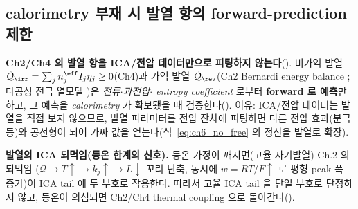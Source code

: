 \subsection{calorimetry 부재 시 발열 항의 forward-prediction 제한}\label{sec:ch6_heat}
\textbf{Ch2/Ch4 의 발열 항을 ICA/전압 데이터만으로 피팅하지 않는다}(). 비가역 발열
$\dot{\mathcal Q}_\irr=\sum_j n_j^{\eff}I_j\eta_j\ge0$(Ch4)과 가역 발열 $\dot{\mathcal Q}_\rev$(Ch2 Bernardi
energy balance \cite{bernardi1985}; 다공성 전극 열모델 \cite{thomasnewman2003})은 \emph{전류$\cdot$과전압$\cdot$
entropy coefficient} 로부터 \textbf{forward 로 예측}만 하고, 그 예측을 \emph{calorimetry} 가 확보됐을 때
검증한다(). 이유: ICA/전압 데이터는 발열을 직접 보지 않으므로, 발열 파라미터를
전압 잔차에 피팅하면 다른 전압 효과(분극 등)와 공선형이 되어 가짜 값을 얻는다(식~\eqref{eq:ch6_no_free} 의
정신을 발열로 확장).
\begin{boundbox}
\textbf{발열의 ICA 되먹임(등온 한계의 신호).} 등온 가정이 깨지면(고율 자기발열) Ch.2 의 되먹임
($\dot{\mathcal Q}\to T\uparrow\to k_j\uparrow\to L\downarrow$ 꼬리 단축, 동시에 $w=RT/F\uparrow$ 로 평형 peak
폭 증가)이 ICA tail 에 두 부호로 작용한다. 따라서 고율 ICA tail 을 단일 부호로 단정하지 않고, 등온이 의심되면
Ch2/Ch4 thermal coupling 으로 돌아간다().
\end{boundbox}

